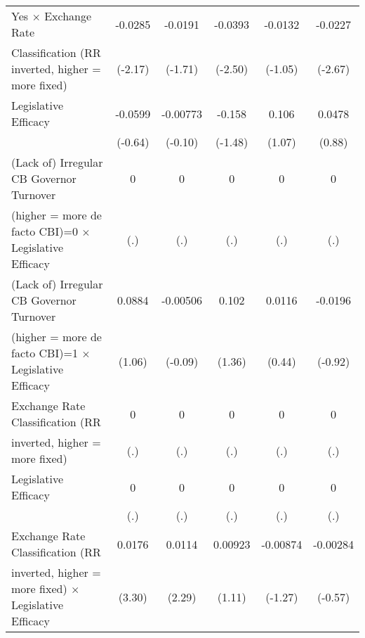 \begin{table}[htbp]
\begin{tabular}{l*{5}{c}}
Yes $\times$ Exchange Rate              &  -0.0285\sym{*}  &  -0.0191         &  -0.0393\sym{*}  &  -0.0132         &  -0.0227\sym{**} \\
Classification (RR inverted, higher = more fixed)&  (-2.17)         &  (-1.71)         &  (-2.50)         &  (-1.05)         &  (-2.67)         \\
\addlinespace
Legislative Efficacy                    &  -0.0599         & -0.00773         &   -0.158         &    0.106         &   0.0478         \\
                                        &  (-0.64)         &  (-0.10)         &  (-1.48)         &   (1.07)         &   (0.88)         \\
\addlinespace
(Lack of) Irregular CB Governor Turnover&        0         &        0         &        0         &        0         &        0         \\
(higher = more de facto CBI)=0 $\times$ Legislative Efficacy&      (.)         &      (.)         &      (.)         &      (.)         &      (.)         \\
\addlinespace
(Lack of) Irregular CB Governor Turnover&   0.0884         & -0.00506         &    0.102         &   0.0116         &  -0.0196         \\
(higher = more de facto CBI)=1 $\times$ Legislative Efficacy&   (1.06)         &  (-0.09)         &   (1.36)         &   (0.44)         &  (-0.92)         \\
\addlinespace
Exchange Rate Classification (RR        &        0         &        0         &        0         &        0         &        0         \\
inverted, higher = more fixed)          &      (.)         &      (.)         &      (.)         &      (.)         &      (.)         \\
\addlinespace
Legislative Efficacy                    &        0         &        0         &        0         &        0         &        0         \\
                                        &      (.)         &      (.)         &      (.)         &      (.)         &      (.)         \\
\addlinespace
Exchange Rate Classification (RR        &   0.0176\sym{**} &   0.0114\sym{*}  &  0.00923         & -0.00874         & -0.00284         \\
inverted, higher = more fixed) $\times$ Legislative Efficacy&   (3.30)         &   (2.29)         &   (1.11)         &  (-1.27)         &  (-0.57)         \\

\end{tabular}
\end{table}
